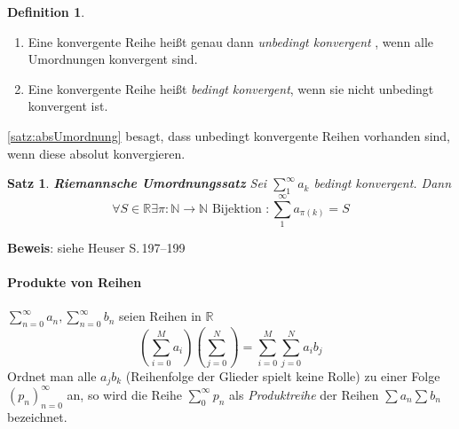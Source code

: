 \documentclass[ngerman,titlepage,twoside, parskip=half*]{scrreprt}
\newcommand*{\N}{\mathbb{N}}
\newcommand*{\R}{\mathbb{R}}
\theoremstyle{plain}
\newtheorem{theorem}{Satz}[section]
\theoremstyle{definition}
\newtheorem{definition}{Definition}
\theoremstyle{remark}
\begin{document}
\begin{definition}
\begin{enumerate}[(1)]
  \item Eine konvergente Reihe heißt genau dann \emph{unbedingt kon\-ver\-gent
    }, wenn alle Umordnungen konvergent sind.
  \item Eine konvergente Reihe heißt \emph{bedingt konvergent}, wenn
    sie nicht unbedingt kon\-ver\-gent ist.
\end{enumerate}
\end{definition}

\autoref{satz:absUmordnung} besagt, dass unbedingt konvergente Reihen vorhanden sind, wenn diese absolut konvergieren.

\begin{theorem}
\textbf{Riemannsche Umordnungssatz} Sei $\sum_1^\infty
a_k$ bedingt konvergent. Dann 
\[\forall S \in \R \exists \pi \colon\N\rightarrow\N \text{ Bijektion }\colon\sum_1^\infty a_{\pi(k)}=S\]
\end{theorem}
\textbf{Beweis}: siehe Heuser S.\,197--199

\paragraph{Produkte von Reihen}

$\sum_{n=0}^\infty a_n, \sum_{n=0}^\infty b_n$ seien Reihen in $\R$
\[\left(\sum_{i=0}^M a_i\right)\left( \sum_{j=0}^N\right) =\sum_{i=0}^M \sum_{j=0}^N a_ib_j\]
Ordnet man alle $a_jb_k$ (Reihenfolge der Glieder spielt keine Rolle) zu einer Folge $(p_n)_{n=0}^\infty$ an, so wird
die Reihe $\sum_0^\infty p_n$ als \emph{Produktreihe} der Reihen $\sum a_n \sum b_n$ bezeichnet.
\end{document}
